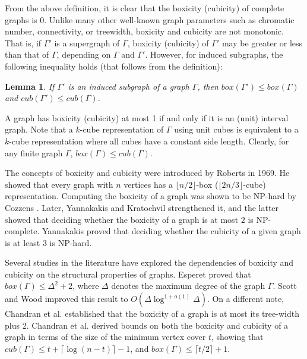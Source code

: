 \documentclass[twoside, 11pt]{article}
\newtheorem{lemma}{Lemma}
\newcommand{\G}{\Gamma}
\begin{document}
From the above definition, it is clear that the boxicity (cubicity) of complete graphs is $0$.
Unlike many other well-known graph parameters such as chromatic number, connectivity, or treewidth, boxicity and cubicity are not monotonic. That is, if $\G'$ is a supergraph of $\G$, boxicity (cubicity) of $\G'$ may be greater or less than that of $\G$, depending on $\G$ and $\G'$.  However,  for induced subgraphs, the following inequality holds (that follows from the definition): %

\begin{lemma}\label{subgraph}
 If $\G'$ is an induced subgraph of a graph $\G$, then $box(\G') \leq box(\G)$ and $cub(\G') \leq cub(\G)$.
 \end{lemma}


A graph has boxicity (cubicity) at most 1 if and only if it is an (unit) interval graph.  Note that a $k$-cube representation of $\G$ using unit cubes is equivalent to a $k$-cube representation where all cubes have a constant side length. Clearly, for any finite graph $\Gamma$, $box(\G) \leq cub(\G)$.


The concepts of boxicity and cubicity were introduced by Roberts \cite{MR0252268} in 1969. %
He showed that every graph with $n$ vertices has a $\lfloor n/2 \rfloor$-box   ($\lfloor 2n / 3 \rfloor$-cube) representation. Computing the boxicity of a graph was shown to be NP-hard by Cozzens \cite{cozzens1982higher}. Later, Yannakakis \cite{yannakakis1982complexity} and Kratochvil \cite{kratochvil1994special} strengthened it, and the latter showed that deciding
whether the boxicity of a graph is at most $2$ is NP-complete. Yannakakis \cite{yannakakis1982complexity} proved that deciding whether the cubicity of a given graph is at least $3$ is NP-hard.


Several studies in the literature have explored the dependencies of boxicity and cubicity on the structural properties of graphs. Esperet \cite{esperet2009boxicity} proved that $box(\G) \leq \Delta^2 + 2$, where $\Delta$ denotes the maximum degree of the graph $\G$. Scott and Wood \cite{scott2020better} improved this result to $O(\Delta \log^{1+o(1)} \Delta)$. %
On a different note, Chandran et al. \cite{chandran2007boxicity} established that the boxicity of a graph is at most its tree-width plus 2. Chandran et al. \cite{chandran2009cubicity} derived bounds on both the boxicity and cubicity of a graph in terms of the size of the minimum vertex cover $t$, showing that $cub(\G) \leq t + \lceil \log(n - t) \rceil - 1$, and $box(\G) \leq \lceil t/2 \rceil + 1$. 
\end{document}
